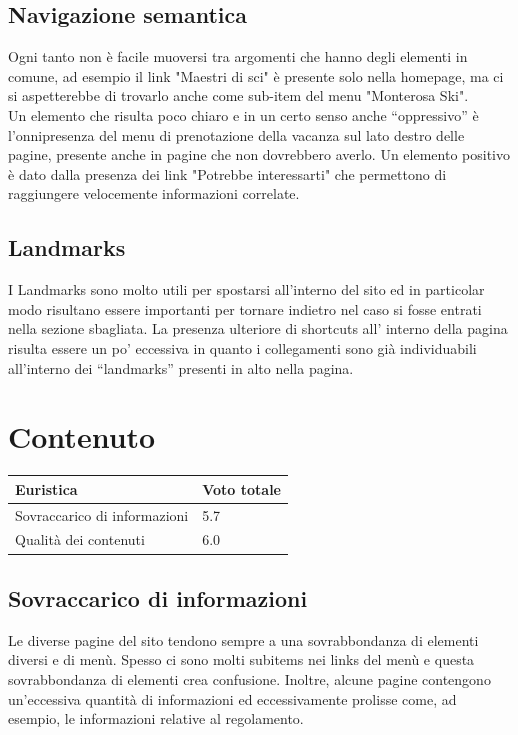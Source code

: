         \subsection{Navigazione semantica}
        Ogni tanto non è facile muoversi tra argomenti che hanno degli elementi
        in comune, ad esempio il link "Maestri di sci" è presente solo nella
        homepage, ma ci si aspetterebbe di trovarlo anche come sub-item del menu
        "Monterosa Ski". \\ Un elemento che risulta poco chiaro e in un
        certo senso anche “oppressivo” è l’onnipresenza del menu di
        prenotazione della vacanza sul lato destro delle pagine, presente anche
        in pagine che non dovrebbero averlo.
        Un elemento positivo è dato dalla presenza dei link
        "Potrebbe interessarti" che permettono di raggiungere velocemente
        informazioni correlate.

        \subsection{Landmarks}
        I Landmarks sono molto utili per spostarsi all'interno del sito ed in
        particolar modo risultano essere importanti per tornare indietro nel
        caso si fosse entrati nella sezione sbagliata. 
        La presenza ulteriore di shortcuts all’ interno della pagina risulta
        essere un po’ eccessiva in quanto i collegamenti sono già individuabili
        all'interno dei “landmarks” presenti in alto nella pagina.
    \section{Contenuto}
    \begin{table}[H]
        \begin{tabular}{|l|l|}
        \hline \textbf{Euristica}& \textbf{Voto totale} \\ \hline
        Sovraccarico di informazioni    & 5.7 \\ \hline
        Qualità dei contenuti           & 6.0 \\ \hline
        \end{tabular}
        \end{table}
        \subsection{Sovraccarico di informazioni}
        Le diverse pagine del sito tendono sempre a una sovrabbondanza di
        elementi diversi e di menù. Spesso ci sono molti subitems nei links del
        menù e questa sovrabbondanza di elementi crea confusione. Inoltre,
        alcune pagine contengono un'eccessiva quantità di informazioni ed
        eccessivamente prolisse come, ad esempio, le informazioni relative al
        regolamento.
